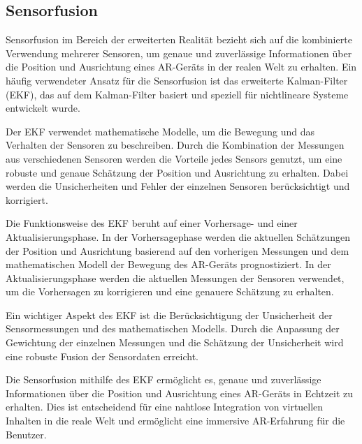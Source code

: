 \subsection{Sensorfusion}
Sensorfusion im Bereich der erweiterten Realität bezieht sich auf die
kombinierte Verwendung mehrerer Sensoren, um genaue und zuverlässige
Informationen über die Position und Ausrichtung eines AR-Geräts in der realen
Welt zu erhalten. Ein häufig verwendeter Ansatz für die Sensorfusion ist das
erweiterte Kalman-Filter (EKF), das auf dem Kalman-Filter basiert und speziell
für nichtlineare Systeme entwickelt wurde.

Der EKF verwendet mathematische Modelle, um die Bewegung und das Verhalten der
Sensoren zu beschreiben. Durch die Kombination der Messungen aus verschiedenen
Sensoren werden die Vorteile jedes Sensors genutzt, um eine robuste und genaue
Schätzung der Position und Ausrichtung zu erhalten. Dabei werden die
Unsicherheiten und Fehler der einzelnen Sensoren berücksichtigt und korrigiert.

Die Funktionsweise des EKF beruht auf einer Vorhersage- und einer
Aktualisierungsphase. In der Vorhersagephase werden die aktuellen Schätzungen
der Position und Ausrichtung basierend auf den vorherigen Messungen und dem
mathematischen Modell der Bewegung des AR-Geräts prognostiziert. In der
Aktualisierungsphase werden die aktuellen Messungen der Sensoren verwendet, um
die Vorhersagen zu korrigieren und eine genauere Schätzung zu erhalten.

Ein wichtiger Aspekt des EKF ist die Berücksichtigung der Unsicherheit der
Sensormessungen und des mathematischen Modells. Durch die Anpassung der
Gewichtung der einzelnen Messungen und die Schätzung der Unsicherheit wird eine
robuste Fusion der Sensordaten erreicht.

Die Sensorfusion mithilfe des EKF ermöglicht es, genaue und zuverlässige
Informationen über die Position und Ausrichtung eines AR-Geräts in Echtzeit zu
erhalten. Dies ist entscheidend für eine nahtlose Integration von virtuellen
Inhalten in die reale Welt und ermöglicht eine immersive AR-Erfahrung für die
Benutzer. \cite{5336489,simon2006optimal}


